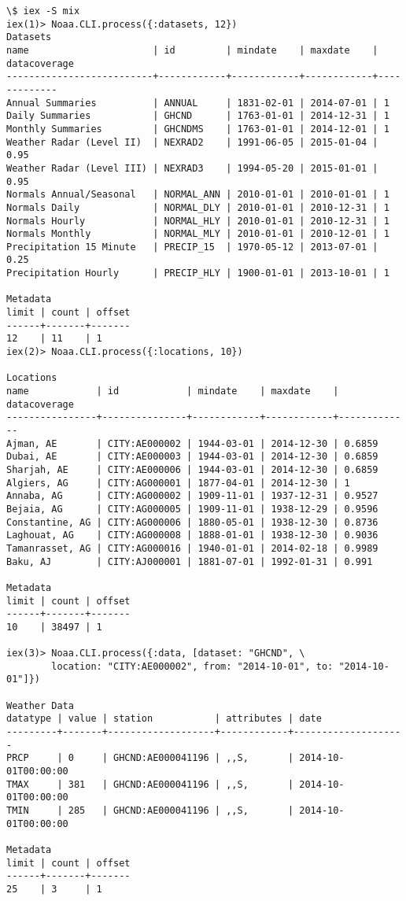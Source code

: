 \documentclass[10pt, a4paper]{article}
\begin{document}
\begin{verbatim}
\$ iex -S mix
iex(1)> Noaa.CLI.process({:datasets, 12})
Datasets
name                      | id         | mindate    | maxdate    | datacoverage
--------------------------+------------+------------+------------+-------------
Annual Summaries          | ANNUAL     | 1831-02-01 | 2014-07-01 | 1         
Daily Summaries           | GHCND      | 1763-01-01 | 2014-12-31 | 1        
Monthly Summaries         | GHCNDMS    | 1763-01-01 | 2014-12-01 | 1       
Weather Radar (Level II)  | NEXRAD2    | 1991-06-05 | 2015-01-04 | 0.95     
Weather Radar (Level III) | NEXRAD3    | 1994-05-20 | 2015-01-01 | 0.95     
Normals Annual/Seasonal   | NORMAL_ANN | 2010-01-01 | 2010-01-01 | 1       
Normals Daily             | NORMAL_DLY | 2010-01-01 | 2010-12-31 | 1       
Normals Hourly            | NORMAL_HLY | 2010-01-01 | 2010-12-31 | 1      
Normals Monthly           | NORMAL_MLY | 2010-01-01 | 2010-12-01 | 1     
Precipitation 15 Minute   | PRECIP_15  | 1970-05-12 | 2013-07-01 | 0.25 
Precipitation Hourly      | PRECIP_HLY | 1900-01-01 | 2013-10-01 | 1    
                                                                       
Metadata
limit | count | offset
------+-------+-------
12    | 11    | 1     
iex(2)> Noaa.CLI.process({:locations, 10})
                                          
Locations
name            | id            | mindate    | maxdate    | datacoverage
----------------+---------------+------------+------------+-------------
Ajman, AE       | CITY:AE000002 | 1944-03-01 | 2014-12-30 | 0.6859      
Dubai, AE       | CITY:AE000003 | 1944-03-01 | 2014-12-30 | 0.6859      
Sharjah, AE     | CITY:AE000006 | 1944-03-01 | 2014-12-30 | 0.6859      
Algiers, AG     | CITY:AG000001 | 1877-04-01 | 2014-12-30 | 1          
Annaba, AG      | CITY:AG000002 | 1909-11-01 | 1937-12-31 | 0.9527    
Bejaia, AG      | CITY:AG000005 | 1909-11-01 | 1938-12-29 | 0.9596   
Constantine, AG | CITY:AG000006 | 1880-05-01 | 1938-12-30 | 0.8736  
Laghouat, AG    | CITY:AG000008 | 1888-01-01 | 1938-12-30 | 0.9036 
Tamanrasset, AG | CITY:AG000016 | 1940-01-01 | 2014-02-18 | 0.9989
Baku, AJ        | CITY:AJ000001 | 1881-07-01 | 1992-01-31 | 0.991 
                                                                 
Metadata
limit | count | offset
------+-------+-------
10    | 38497 | 1    

iex(3)> Noaa.CLI.process({:data, [dataset: "GHCND", \
        location: "CITY:AE000002", from: "2014-10-01", to: "2014-10-01"]})

Weather Data
datatype | value | station           | attributes | date
---------+-------+-------------------+------------+--------------------
PRCP     | 0     | GHCND:AE000041196 | ,,S,       | 2014-10-01T00:00:00
TMAX     | 381   | GHCND:AE000041196 | ,,S,       | 2014-10-01T00:00:00
TMIN     | 285   | GHCND:AE000041196 | ,,S,       | 2014-10-01T00:00:00

Metadata
limit | count | offset
------+-------+-------
25    | 3     | 1     
\end{verbatim}
\end{document}
